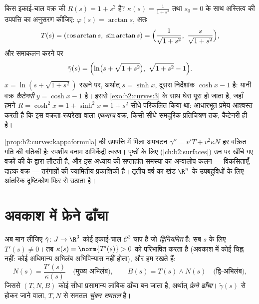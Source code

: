 \begin{example}[वक्रता से वक्र का
पुनर्निर्माण]\label{ex:b2:curves:reconstruction}
किस इकाई-चाल वक्र की  $R(s) = 1 +
s^2$ है? $\kappa(s) =
\frac1{1+s^2}$ तथा $s_0 = 0$ के साथ अस्तित्व की उपपत्ति का अनुसरण
कीजिए: $\varphi(s) = \arctan s$, अतः
\[
T(s) = (\cos\arctan s,\ \sin\arctan s)
= \Bigl(\frac{1}{\sqrt{1+s^2}},\
\frac{s}{\sqrt{1+s^2}}\Bigr),
\]
और समाकलन करने पर
\[
\tilde\gamma(s) = \Bigl(\ln\bigl(s + \sqrt{1 + s^2}\bigr),\
\sqrt{1 + s^2} - 1\Bigr).
\]
$x = \ln(s + \sqrt{1+s^2})$ रखने पर, अर्थात् $s = \sinh x$, दूसरा
निर्देशांक $\cosh x - 1$ है: यानी वक्र \emph{कैटेनरी}
$y = \cosh x - 1$ है। इससे \cref{exo:b2:curves:3} के साथ घेरा पूरा हो जाता है, जहाँ हमने
$R = \cosh^2 x = 1 +
\sinh^2 x = 1 + s^2$ सीधे परिकलित किया था: आधारभूत प्रमेय
आश्वस्त करती है कि इस वक्रता-रूपरेखा वाला \emph{एकमात्र} वक्र, किसी
सीधे समदूरिक प्रतिचित्रण तक, कैटेनरी ही है।
\end{example}

\begin{remark}[वक्रता आगे कहाँ काम आती है]
\cref{prop:b2:curves:kappaformula} की उपपत्ति में मिला अपघटन $\gamma'' = v'T + v^2\kappa N$ हर
वक्रित गति की गतिकी है: स्पर्शीय बनाम अभिकेंद्री त्वरण। 
पृष्ठों के लिए (\cref{ch:b2:surfaces}) उन पर खींचे गए वक्रों की  के
द्वारा लौटती है, और इस अध्याय की सप्ताहांत समस्या का अन्वालोप-कलन ---
विकसिताएँ, दाहक वक्र --- तरंगाग्रों की ज्यामितीय प्रकाशिकी है। तृतीय
वर्ष का खंड $\R^n$ के उपबहुविधों के लिए आंतरिक दृष्टिकोण फिर से
उठाता है।
\end{remark}

\section{अवकाश में फ्रेने ढाँचा}

अब मान लीजिए $\tilde\gamma \colon J \to \R^3$ कोई इकाई-चाल
$\mathcal{C}^3$ चाप है जो \emph{द्विनियमित} है: सब $s$ के लिए
$T'(s) \neq 0$। तब $\kappa(s) = \norm{T'(s)} > 0$ \emph{} को परिभाषित करता है
(अवकाश में कोई चिह्न नहीं: कोई अधिमान्य अभिलंब अभिविन्यास नहीं होता),
और हम रखते हैं:
\[
N(s) = \frac{T'(s)}{\kappa(s)}
\quad\text{(मुख्य अभिलंब)},
\qquad
B(s) = T(s) \wedge N(s)
\quad\text{(द्वि-अभिलंब)} ,
\]
जिससे $(T, N, B)$ कोई सीधा प्रसामान्य लांबिक ढाँचा बन जाता है, अर्थात्
\emph{फ्रेने ढाँचा}। $\tilde\gamma(s)$ से होकर जाने वाला, $T, N$ से 
समतल \emph{चुंबन समतल} है।

